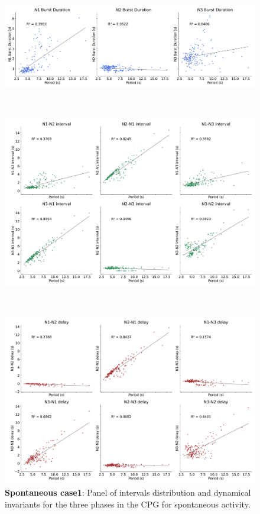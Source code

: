 \begin{figure}[htbp]
\begin{minipage}[b]{0.53\textwidth}
		\begin{minipage}[b]{\textwidth}
			\centering
			\includegraphics[width=\textwidth]{./invariants/data/SUSSEX/prep1/images/spontaneous_durations.pdf}
		\end{minipage}\\
		\begin{minipage}[b]{\textwidth}
			\centering
			\includegraphics[width=\textwidth]{./invariants/data/SUSSEX/prep1/images/spontaneous_intervals.pdf}
		\end{minipage}\\
		\begin{minipage}[b]{\textwidth}
			\centering
			\includegraphics[width=\textwidth]{./invariants/data/SUSSEX/prep1/images/spontaneous_delays.pdf}
		\end{minipage}
	\end{minipage}
	\caption{\textbf{Spontaneous case1}: Panel of intervals distribution and dynamical invariants for the three phases in the CPG for spontaneous activity.}
	\label{fig:prep1 invariants}
\end{figure}

